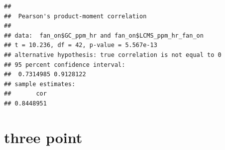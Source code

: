 \documentclass[
]{article}
\newenvironment{Shaded}{\begin{snugshade}}{\end{snugshade}}
\newcommand{\AttributeTok}[1]{\textcolor[rgb]{0.13,0.29,0.53}{#1}}
\newcommand{\FunctionTok}[1]{\textcolor[rgb]{0.13,0.29,0.53}{\textbf{#1}}}
\newcommand{\NormalTok}[1]{#1}
\newcommand{\SpecialCharTok}[1]{\textcolor[rgb]{0.81,0.36,0.00}{\textbf{#1}}}
\newcommand{\StringTok}[1]{\textcolor[rgb]{0.31,0.60,0.02}{#1}}
\begin{document}
\begin{Shaded}
\end{Shaded}

\begin{verbatim}
## 
##  Pearson's product-moment correlation
## 
## data:  fan_on$GC_ppm_hr and fan_on$LCMS_ppm_hr_fan_on
## t = 10.236, df = 42, p-value = 5.567e-13
## alternative hypothesis: true correlation is not equal to 0
## 95 percent confidence interval:
##  0.7314985 0.9128122
## sample estimates:
##       cor 
## 0.8448951
\end{verbatim}

\section{three point}\label{three-point}
\end{document}
